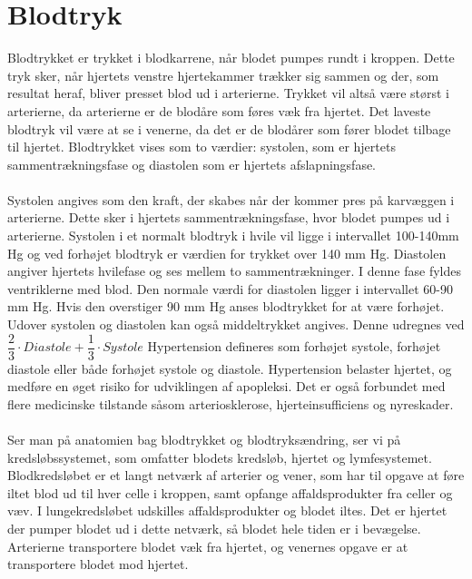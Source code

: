 \section{Blodtryk}
Blodtrykket er trykket i blodkarrene, når blodet pumpes rundt i kroppen. Dette tryk sker, når hjertets venstre hjertekammer trækker sig sammen og der, som resultat heraf, bliver presset blod ud i arterierne. Trykket vil altså være størst i arterierne, da arterierne er de blodåre som føres væk fra hjertet. Det laveste blodtryk vil være at se i venerne, da det er de blodårer som fører blodet tilbage til hjertet. Blodtrykket vises som to værdier: systolen, som er hjertets sammentrækningsfase og diastolen som er hjertets afslapningsfase. \\\\
Systolen angives som den kraft, der skabes når der kommer pres på karvæggen i arterierne. Dette sker i hjertets sammentrækningsfase, hvor blodet pumpes ud i arterierne. Systolen i et normalt blodtryk i hvile vil ligge i intervallet 100-140mm Hg og ved forhøjet blodtryk er værdien for trykket over 140 mm Hg. Diastolen angiver hjertets hvilefase og ses mellem to sammentrækninger. I denne fase fyldes ventriklerne med blod. Den normale værdi for diastolen ligger i intervallet 60-90 mm Hg. Hvis den overstiger 90 mm Hg anses blodtrykket for at være forhøjet. Udover systolen og diastolen kan også middeltrykket angives. Denne udregnes ved $\dfrac{2}{3}\cdot Diastole + \dfrac{1}{3}\cdot Systole$ \cite{blodtrykwiki}
Hypertension defineres som forhøjet systole, forhøjet diastole eller både forhøjet systole og diastole. Hypertension belaster hjertet, og medføre en øget risiko for udviklingen af apopleksi. Det er også forbundet med flere medicinske tilstande såsom arteriosklerose, hjerteinsufficiens og nyreskader. \cite{pulmonal} \\\\
Ser man på anatomien bag blodtrykket og blodtryksændring, ser vi på kredsløbssystemet, som omfatter blodets kredsløb, hjertet og lymfesystemet. Blodkredsløbet er et langt netværk af arterier og vener, som har til opgave at føre iltet blod ud til hver celle i kroppen, samt opfange affaldsprodukter fra celler og væv.\cite{pulmonal}  I lungekredsløbet udskilles affaldsprodukter og blodet iltes. Det er hjertet der pumper blodet ud i dette netværk, så blodet hele tiden er i bevægelse. Arterierne transportere blodet væk fra hjertet, og venernes opgave er at transportere blodet mod hjertet. 
